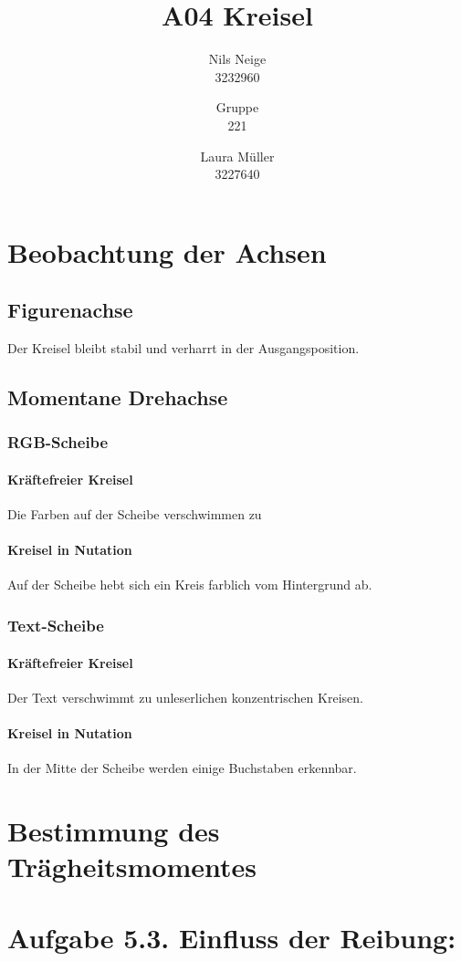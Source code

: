 \documentclass[a4paper]{scrartcl}
\title{A04 Kreisel}
\author{Nils Neige\\3232960\and Gruppe\\221\and Laura Müller\\3227640}
\begin{document}
\maketitle
\tableofcontents
\section{Beobachtung der Achsen}
\subsection{Figurenachse}
Der Kreisel bleibt stabil und verharrt in der Ausgangsposition.
\subsection{Momentane Drehachse}

\subsubsection{RGB-Scheibe}
\paragraph{Kräftefreier Kreisel}
Die Farben auf der Scheibe verschwimmen zu 
\paragraph{Kreisel in Nutation}
Auf der Scheibe hebt sich ein Kreis farblich vom Hintergrund ab.

\subsubsection{Text-Scheibe}
\paragraph{Kräftefreier Kreisel}
Der Text verschwimmt zu unleserlichen konzentrischen Kreisen.
\paragraph{Kreisel in Nutation}
In der Mitte der Scheibe werden einige Buchstaben erkennbar.
\section{Bestimmung des Trägheitsmomentes}


\section{Aufgabe 5.3. Einfluss der Reibung:}
	
\end{document}
